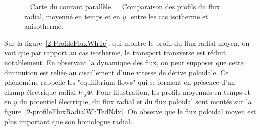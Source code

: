\begin{refsection}
\begin{figure}[!htbp]
\centering
    \caption{~ Carte du courant parallèle.
    ~~Comparaison des profils du flux radial, moyenné en temps et en $y$, entre les cas
    isotherme et anisotherme.}
\end{figure}

Sur la figure~\ref{2-ProfileFluxWhTe}, qui montre le profil du flux radial
moyen, on voit que par rapport au cas isotherme, le transport transverse est réduit
notablement. En observant la dynamique des flux, on peut supposer que cette
diminution est reliée au cisaillement d'une vitesse de dérive poloïdale.
Ce phénomène rappelle les "equilibrium flows" qui se forment en présence
d'un champ électrique radial $\nabla_x{\Phi}$. Pour illustration, les profils
moyennés en temps et en $y$ du potentiel électrique, du flux radial et du
flux poloïdal sont montés sur la figure~\ref{2-profileFluxRadialWhTedNdx}. On
observe que le flux poloïdal moyen est plus important que son homologue radial.


\end{refsection}
